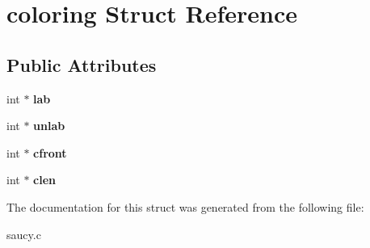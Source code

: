 \hypertarget{structcoloring}{\section{coloring Struct Reference}
\label{structcoloring}
}
\subsection*{Public Attributes}
\begin{DoxyCompactItemize}
\item 
\hypertarget{structcoloring_a1a9a84936f4a35b0413dc53e175ba53a}{int $\ast$ {\bfseries lab}}\label{structcoloring_a1a9a84936f4a35b0413dc53e175ba53a}

\item 
\hypertarget{structcoloring_a77c4b266759032003cd8e78e898a62f5}{int $\ast$ {\bfseries unlab}}\label{structcoloring_a77c4b266759032003cd8e78e898a62f5}

\item 
\hypertarget{structcoloring_a86622c04829c50e69ff3e5738e2eb1cf}{int $\ast$ {\bfseries cfront}}\label{structcoloring_a86622c04829c50e69ff3e5738e2eb1cf}

\item 
\hypertarget{structcoloring_a02053661de38e50111da2c560cbe6694}{int $\ast$ {\bfseries clen}}\label{structcoloring_a02053661de38e50111da2c560cbe6694}

\end{DoxyCompactItemize}


The documentation for this struct was generated from the following file\-:\begin{DoxyCompactItemize}
\item 
saucy.\-c\end{DoxyCompactItemize}

